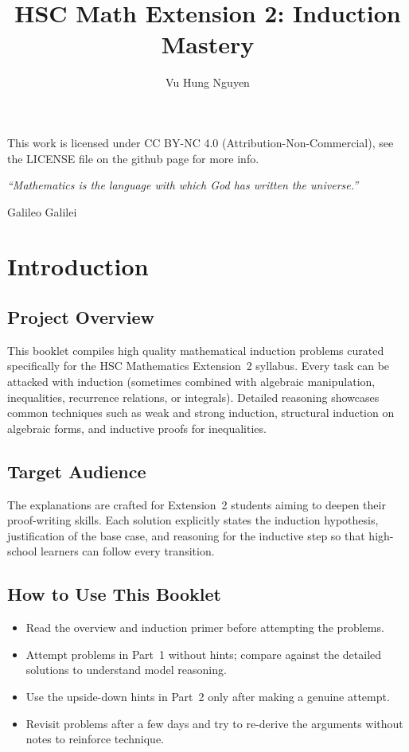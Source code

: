 \documentclass[12pt]{article}
\author{Vu Hung Nguyen}
\title{HSC Math Extension 2: Induction Mastery}
\date{}
\begin{document}


\newpage


\begingroup\small\noindent This work is licensed under CC BY-NC 4.0 (Attribution-Non-Commercial), see the LICENSE file on the github page for more info.\par\endgroup

\newpage
\thispagestyle{empty}
\vspace*{\fill}
\begin{center}
\itshape
``Mathematics is the language with which God has written the universe.''

\vspace{1em}
\normalfont Galileo Galilei
\end{center}
\vspace*{\fill}

\newpage
\tableofcontents
\newpage

\section{Introduction}

\subsection{Project Overview}
This booklet compiles high quality mathematical induction problems curated specifically for the HSC Mathematics Extension~2 syllabus. Every task can be attacked with induction (sometimes combined with algebraic manipulation, inequalities, recurrence relations, or integrals). Detailed reasoning showcases common techniques such as weak and strong induction, structural induction on algebraic forms, and inductive proofs for inequalities.

\subsection{Target Audience}
The explanations are crafted for Extension~2 students aiming to deepen their proof-writing skills. Each solution explicitly states the induction hypothesis, justification of the base case, and reasoning for the inductive step so that high-school learners can follow every transition.

\subsection{How to Use This Booklet}
\begin{itemize}[leftmargin=*]
  \item Read the overview and induction primer before attempting the problems.
  \item Attempt problems in Part~1 without hints; compare against the detailed solutions to understand model reasoning.
  \item Use the upside-down hints in Part~2 only after making a genuine attempt.
  \item Revisit problems after a few days and try to re-derive the arguments without notes to reinforce technique.
\end{itemize}
\end{document}
